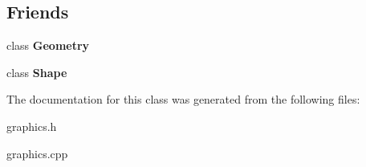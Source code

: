 \subsection*{Friends}
\begin{DoxyCompactItemize}
\item 
\hypertarget{classg2c_1_1_effect_a9aca7b7350e6ffa0e2d6320834ad1857}{
class {\bfseries Geometry}}
\label{classg2c_1_1_effect_a9aca7b7350e6ffa0e2d6320834ad1857}

\item 
\hypertarget{classg2c_1_1_effect_a1e1ef8352d0a310bace7f7a3307d1378}{
class {\bfseries Shape}}
\label{classg2c_1_1_effect_a1e1ef8352d0a310bace7f7a3307d1378}

\end{DoxyCompactItemize}


The documentation for this class was generated from the following files:\begin{DoxyCompactItemize}
\item 
graphics.h\item 
graphics.cpp\end{DoxyCompactItemize}
